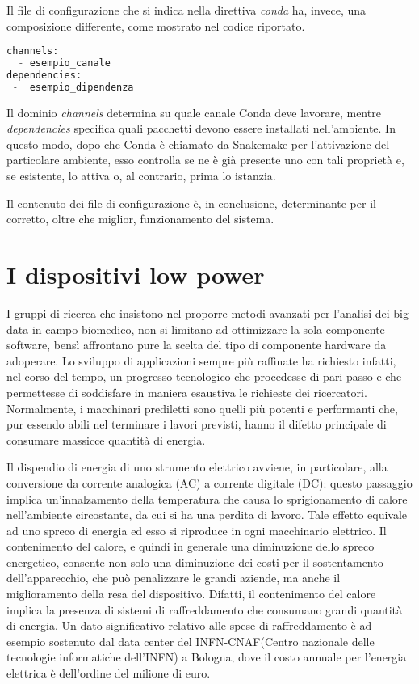 Il file di configurazione che si indica nella direttiva \textit{conda} ha, invece, una composizione differente, come mostrato nel codice riportato.
\begin{lstlisting}[language=Python]
channels:
  - esempio_canale
dependencies:
 -  esempio_dipendenza
\end{lstlisting}
Il dominio \textit{channels} determina su quale canale Conda deve lavorare, mentre \textit{dependencies} specifica quali pacchetti devono essere installati nell'ambiente.
In questo modo, dopo che Conda è chiamato da Snakemake per l'attivazione del particolare ambiente, esso controlla se ne è già presente uno con tali proprietà e, se esistente, lo attiva o, al contrario, prima lo istanzia.

Il contenuto dei file di configurazione è, in conclusione, determinante per il corretto, oltre che miglior, funzionamento del sistema.

\section{I dispositivi low power}
\label{sec:LP}
I gruppi di ricerca che insistono nel proporre metodi avanzati per l'analisi dei big data in campo biomedico, non si limitano ad ottimizzare la sola componente software, bensì affrontano pure la scelta del tipo di componente hardware da adoperare.
Lo sviluppo di applicazioni sempre più raffinate ha richiesto infatti, nel corso del tempo, un progresso tecnologico che procedesse di pari passo e che permettesse di soddisfare in maniera esaustiva le richieste dei ricercatori.
Normalmente, i macchinari prediletti sono quelli più potenti e performanti che, pur essendo abili nel terminare i lavori previsti, hanno il difetto principale di consumare massicce quantità di energia.

Il dispendio di energia di uno strumento elettrico avviene, in particolare, alla conversione da corrente analogica (AC) a corrente digitale (DC): questo passaggio implica un'innalzamento della temperatura che causa lo sprigionamento di calore nell'ambiente circostante, da cui si ha una perdita di lavoro.
Tale effetto equivale ad uno spreco di energia ed esso si riproduce in ogni macchinario elettrico.
Il contenimento del calore, e quindi in generale una diminuzione dello spreco energetico, consente non solo una diminuzione dei costi per il sostentamento dell'apparecchio, che può penalizzare le grandi aziende, ma anche il miglioramento della resa del dispositivo.
Difatti, il contenimento del calore implica la presenza di sistemi di raffreddamento che consumano grandi quantità di energia.
Un dato significativo relativo alle spese di raffreddamento è ad esempio sostenuto dal data center del INFN-CNAF(Centro nazionale delle tecnologie informatiche dell'INFN) a Bologna, dove il costo annuale per l'energia elettrica è dell'ordine del milione di euro.

